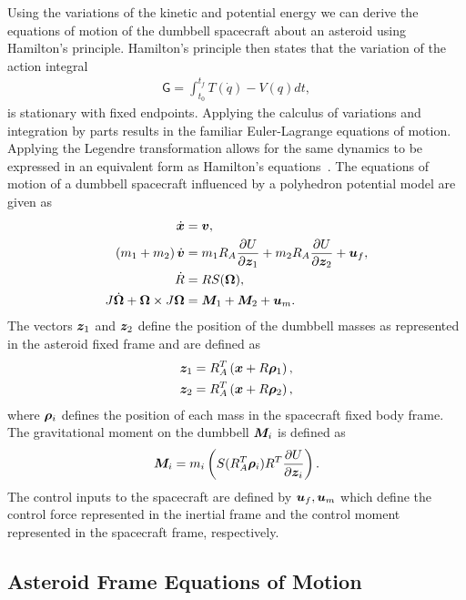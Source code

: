 Using the variations of the kinetic and potential energy we can derive the equations of motion of the dumbbell spacecraft about an asteroid using Hamilton's principle. 
Hamilton's principle then states that the variation of the action integral
\begin{align}
    \mathsf{G} = \int_{t_0}^{t_f} T(\dot{q}) - V(q) dt,
\end{align}
is stationary with fixed endpoints. 
Applying the calculus of variations and integration by parts results in the familiar Euler-Lagrange equations of motion.
Applying the Legendre transformation allows for the same dynamics to be expressed in an equivalent form as Hamilton's equations~\cite{lanczos1970}.
The equations of motion of a dumbbell spacecraft influenced by a polyhedron potential model are given as
\begin{align}
    \dot{\bm{x}} &= \bm{v}, \label{eq:position_kinematics}\\
    \left( m_1 + m_2 \right) \dot{\bm{v}} &= m_1 R_A \frac{\partial U}{\partial \bm{z}_1} + m_2 R_A \frac{\partial U}{\partial \bm{z}_2} + \bm{u}_f, \label{eq:translational_dynamics}\\
    \dot{R} &= R S(\bm{\Omega}) , \label{eq:attitude_kinematics}\\
    J \dot{\bm{\Omega}} + \bm{\Omega} \times J \bm{\Omega} &= \bm{M}_1 + \bm{M}_2 + \bm{u}_m. \label{eq:attitude_dynamics}
\end{align}
The vectors \( \bm{z}_1 \) and \( \bm{z}_2\) define the position of the dumbbell masses as represented in the asteroid fixed frame and are defined as
\begin{align}
    \bm{z}_1 &= R_A^T \left( \bm{x} + R \bm{\rho}_1 \right) , \\
    \bm{z}_2 &= R_A^T \left( \bm{x} + R \bm{\rho}_2 \right), 
\end{align}
where \( \bm{\rho}_i \) defines the position of each mass in the spacecraft fixed body frame.
The gravitational moment on the dumbbell \( \bm{M}_i\) is defined as
\begin{align}
    \bm{M}_i = m_i \left( S(R_A^T \bm{\rho}_i) R^T \frac{\partial U}{\partial \bm{z}_i} \right).
\end{align}
The control inputs to the spacecraft are defined by \( \bm{u}_f, \bm{u}_m \) which define the control force represented in the inertial frame and the control moment represented in the spacecraft frame, respectively. 

\subsection{Asteroid Frame Equations of Motion}


